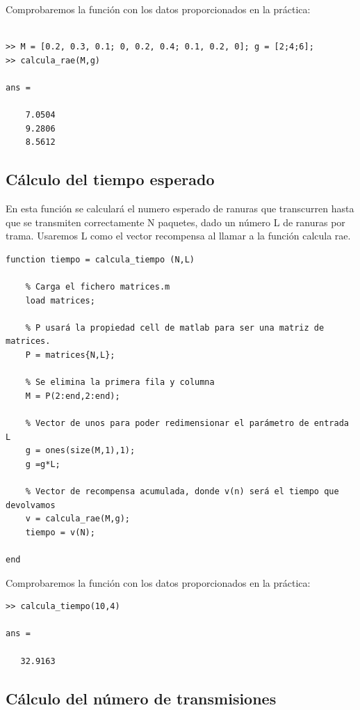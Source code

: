 \documentclass{article}
\begin{document}
Comprobaremos la función con los datos proporcionados en la práctica:

\begin{verbatim}

>> M = [0.2, 0.3, 0.1; 0, 0.2, 0.4; 0.1, 0.2, 0]; g = [2;4;6];
>> calcula_rae(M,g)

ans =

    7.0504
    9.2806
    8.5612
\end{verbatim}



\subsection{Cálculo del tiempo esperado}

En esta función se calculará el numero esperado de ranuras que transcurren hasta que se transmiten correctamente N paquetes, dado un número L de ranuras por trama. Usaremos L como el vector recompensa al llamar a la función calcula rae.

\begin{verbatim}
function tiempo = calcula_tiempo (N,L)

    % Carga el fichero matrices.m
    load matrices;

    % P usará la propiedad cell de matlab para ser una matriz de matrices.
    P = matrices{N,L};

    % Se elimina la primera fila y columna
    M = P(2:end,2:end);

    % Vector de unos para poder redimensionar el parámetro de entrada L
    g = ones(size(M,1),1);
    g =g*L; 

    % Vector de recompensa acumulada, donde v(n) será el tiempo que devolvamos
    v = calcula_rae(M,g);
    tiempo = v(N); 

end
\end{verbatim}

Comprobaremos la función con los datos proporcionados en la práctica:

\begin{verbatim}
>> calcula_tiempo(10,4)

ans =

   32.9163
\end{verbatim}

\subsection{Cálculo del número de transmisiones}
\end{document}
